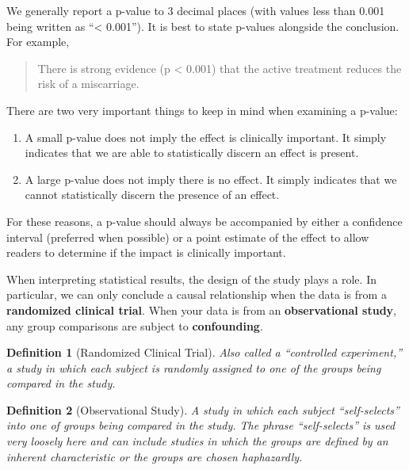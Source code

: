 \documentclass[
]{book}
\providecommand{\tightlist}{%
  \setlength{\itemsep}{0pt}\setlength{\parskip}{0pt}}
\theoremstyle{plain}
\theoremstyle{mydefn}
\newtheorem{definition}{Definition}[chapter]
\theoremstyle{myexmpl}
\theoremstyle{remark}
\begin{document}
We generally report a p-value to 3 decimal places (with values less than 0.001 being written as ``\textless{} 0.001''). It is best to state p-values alongside the conclusion. For example,

\begin{quote}
There is strong evidence (p \textless{} 0.001) that the active treatment reduces the risk of a miscarriage.
\end{quote}

There are two very important things to keep in mind when examining a p-value:

\begin{enumerate}
\def\labelenumi{\arabic{enumi}.}
\tightlist
\item
  A small p-value does not imply the effect is clinically important. It simply indicates that we are able to statistically discern an effect is present.
\item
  A large p-value does not imply there is no effect. It simply indicates that we cannot statistically discern the presence of an effect.
\end{enumerate}

For these reasons, a p-value should always be accompanied by either a confidence interval (preferred when possible) or a point estimate of the effect to allow readers to determine if the impact is clinically important.

When interpreting statistical results, the design of the study plays a role. In particular, we can only conclude a causal relationship when the data is from a \textbf{randomized clinical trial}. When your data is from an \textbf{observational study}, any group comparisons are subject to \textbf{confounding}.

\begin{definition}[Randomized Clinical Trial]
\protect\hypertarget{def:defn-randomized-clinical-trial}{}{\label{def:defn-randomized-clinical-trial} {} }Also called a ``controlled experiment,'' a study in which each subject is randomly assigned to one of the groups being compared in the study.
\end{definition}

\begin{definition}[Observational Study]
\protect\hypertarget{def:defn-observational-study}{}{\label{def:defn-observational-study} {} }A study in which each subject ``self-selects'' into one of groups being compared in the study. The phrase ``self-selects'' is used very loosely here and can include studies in which the groups are defined by an inherent characteristic or the groups are chosen haphazardly.
\end{definition}
\end{document}
